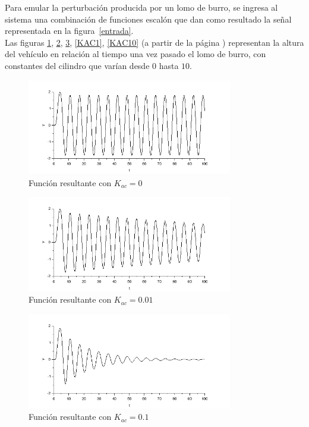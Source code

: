 \documentclass[12pt]{article}
\begin{document}
Para emular la perturbación producida por un lomo de burro, se ingresa al sistema una combinación de funciones escalón que dan como resultado la señal representada en la \mbox{figura \ref{entrada}}.\\

Las figuras \ref{KAC0}, \ref{KAC001}, \ref{KAC01}, \ref{KAC1}, \ref{KAC10} (a partir de la página \pageref{KAC0}) representan la altura del vehículo en relación al tiempo una vez pasado el lomo de burro, con constantes del cilindro que varían desde $0$ hasta $10$.\\

\begin{figure}[p]
\center
\includegraphics[width=0.8\textwidth]{amortiguador_0.PNG}
\caption{Función resultante con $K_{ac}=0$}
\label{KAC0}
\end{figure}

\begin{figure}[p]
\center
\includegraphics[width=0.8\textwidth]{amortiguador_001.PNG}
\caption{Función resultante con $K_{ac}=0.01$}
\label{KAC001}
\end{figure}

\begin{figure}[p]
\center
\includegraphics[width=0.8\textwidth]{amortiguador_01.PNG}
\caption{Función resultante con $K_{ac}=0.1$}
\label{KAC01}
\end{figure}
\end{document}
